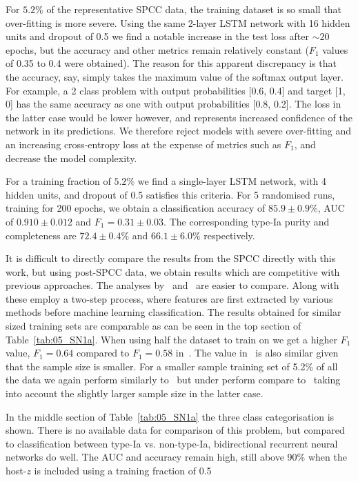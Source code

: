 \documentclass[twocolumn]{aastex61}
\begin{document}
For $5.2\%$ of the representative SPCC data, the training dataset is so small that over-fitting is more severe. Using the same 2-layer LSTM network with 16 hidden units and dropout of 0.5 we find a notable increase in the test loss after $\sim 20$ epochs, but the accuracy and other metrics remain relatively constant ($F_1$ values of 0.35 to 0.4 were obtained). The reason for this apparent discrepancy is that the accuracy, say, simply takes the maximum value of the softmax output layer. For example, a 2 class problem with output probabilities [0.6, 0.4] and target [1, 0] has the same accuracy as one with output probabilities [0.8, 0.2]. The loss in the latter case would be lower however, and represents increased confidence of the network in its predictions. We therefore reject models with severe over-fitting and an increasing cross-entropy loss at the expense of metrics such as $F_1$, and decrease the model complexity. 

For a training fraction of  $5.2\%$ we find a single-layer LSTM network, with 4 hidden units, and dropout of 0.5 satisfies this criteria. For 5 randomised runs, training for 200 epochs, we obtain a classification accuracy of $85.9 \pm 0.9$\%, AUC of $0.910 \pm 0.012$ and $F_1 = 0.31 \pm 0.03$. The corresponding type-Ia purity and completeness are $72.4\pm0.4\%$ and $66.1\pm6.0\%$ respectively.

It is difficult to directly compare the results from the SPCC directly with this work, but using post-SPCC data, we obtain results which are competitive with previous approaches. The analyses by~\cite{Karpenka:2012pm} and~\cite{Newling:2010bp} are easier to compare. Along with~\cite{Lochner:2016hbn} these employ a two-step process, where features are first extracted by various methods before machine learning classification. The results obtained for similar sized training sets are comparable as can be seen in the top section of Table~\ref{tab:05_SN1a}. When using half the dataset to train on we get a higher $F_1$ value, $F_1=0.64$ compared to $F_1=0.58$ in~\cite{Karpenka:2012pm}. The value in~\cite{Newling:2010bp} is also similar given that the sample size is smaller. For a smaller sample training set of 5.2\% of all the data we again perform similarly to~\cite{Karpenka:2012pm} but under perform compare to~\cite{Newling:2010bp} taking into account the slightly larger sample size in the latter case.

In the middle section of Table~\ref{tab:05_SN1a} the three class categorisation is shown. There is no available data for comparison of this problem, but compared to classification between type-Ia vs. non-type-Ia, bidirectional recurrent neural networks do well. The AUC and accuracy remain high, still above 90\% when the host-$z$ is included using a training fraction of 0.5
\end{document}
